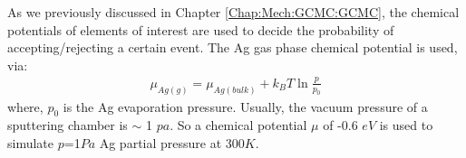 As we previously discussed in Chapter \ref{Chap:Mech:GCMC:GCMC}, the chemical potentials of elements of interest are used to decide the probability of accepting/rejecting a certain event. The Ag gas phase chemical potential is used, via:
\begin{align}
 \mu_{Ag(g)} = \mu_{Ag(bulk)} + k_{B}T\ln{\frac{p}{p_0}}
 \label{Chap:Ag/ZnO:eq:mu_Ag}
\end{align}
where, $p_0$ is the Ag evaporation pressure. Usually, the vacuum pressure of a sputtering chamber is $\sim$ 1 $pa$. So a chemical potential $\mu$ of -0.6 $eV$ is used to simulate $p$=1$Pa$ Ag partial pressure at 300$K$.

\newpage
\begingroup
\begin{figure}[!ht]
  \centering
  \label{Chap:Ag/ZnO:fig:3a}
  \label{Chap:Ag/ZnO:fig:3b}
  \\
  \label{Chap:Ag/ZnO:fig:3c}

\end{figure}
